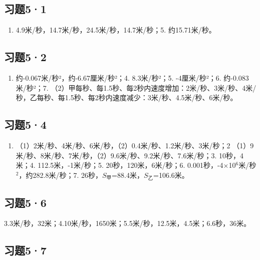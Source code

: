 \subsection{习题5·1}\label{ux4e60ux989851-1}

\begin{enumerate}
\def\labelenumi{\arabic{enumi}.}
\setcounter{enumi}{3}
\tightlist
\item
  4.9米/秒，14.7米/秒，24.5米/秒，14.7米/秒；5. 约15.71米/秒。
\end{enumerate}

\subsection{习题5·2}\label{ux4e60ux989852-1}

\begin{enumerate}
\def\labelenumi{\arabic{enumi}.}
\setcounter{enumi}{2}
\tightlist
\item
  约-0.067米/秒²，约-6.67厘米/秒²；4. 8.3米/秒²；5. -4厘米/秒²；6.
  约-0.083米/秒²；7.
  （2）甲每秒、每1.5秒、每2秒内速度增加：2米/秒、3米/秒、4米/秒，乙每秒、每1.5秒、每2秒内速度减少：3米/秒、4.5米/秒、6米/秒。
\end{enumerate}

\subsection{习题5·4}\label{ux4e60ux989854-1}

\begin{enumerate}
\def\labelenumi{\arabic{enumi}.}
\tightlist
\item
  （1）2米/秒、4米/秒、6米/秒，（2）0.4米/秒、1.2米/秒、3米/秒；2
  （1）9米/秒、8米/秒、7米/秒，（2）9.6米/秒、9.2米/秒、7.6米/秒；3.
  10秒，4米；4. 112.5米，-1米/秒；5. 20秒，120米，6米/秒；6.
  0.001秒，-4×10\(^{6}\)米/秒\(^{2}\)，约282.8米/秒；7.
  26秒，\(S_{\text{甲}}\)=88.4米，\(S_{\text{乙}}\)=106.6米。
\end{enumerate}

\subsection{习题5·6}\label{ux4e60ux989856-1}

3.3米/秒，32米；4.10米/秒，1650米；5.5米/秒，12.5米，4.5米；6.6秒，36米。

\subsection{习题5·7}\label{ux4e60ux989857-1}

